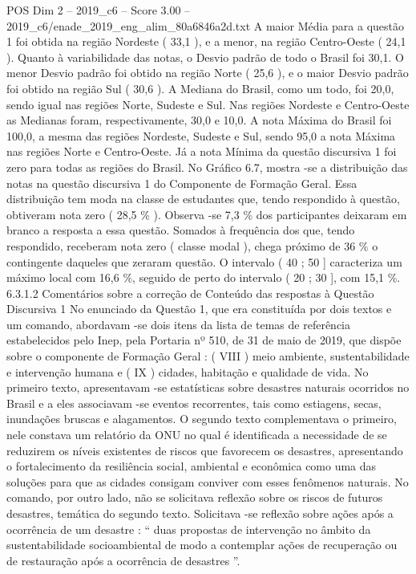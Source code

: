 \begin{textsample}{POS Dim 2 – 2019\_c6 – Score 3.00 – 2019\_c6/enade\_2019\_eng\_alim\_80a6846a2d.txt}
A maior Média para a questão 1 foi obtida na região Nordeste ( 33,1 ), e a menor, na região Centro-Oeste ( 24,1 ).
Quanto à variabilidade das notas, o Desvio padrão de todo o Brasil foi 30,1.
O menor Desvio padrão foi obtido na região Norte ( 25,6 ), e o maior Desvio padrão foi obtido na região Sul ( 30,6 ).
A Mediana do Brasil, como um todo, foi 20,0, sendo igual nas regiões Norte, Sudeste e Sul.
Nas regiões Nordeste e Centro-Oeste as Medianas foram, respectivamente, 30,0 e 10,0.
A nota Máxima do Brasil foi 100,0, a mesma das regiões Nordeste, Sudeste e Sul, sendo 95,0 a nota Máxima nas regiões Norte e Centro-Oeste.
Já a nota Mínima da questão discursiva 1 foi zero para todas as regiões do Brasil.
No Gráfico 6.7, mostra -se a distribuição das notas na questão discursiva 1 do Componente de Formação Geral.
Essa distribuição tem moda na classe de estudantes que, tendo respondido à questão, obtiveram nota zero ( 28,5 \% ).
Observa -se 7,3 \% dos participantes deixaram em branco a resposta a essa questão.
Somados à frequência dos que, tendo respondido, receberam nota zero ( classe modal ), chega próximo de 36 \% o contingente daqueles que zeraram questão.
O intervalo ( 40 ; 50 ] caracteriza um máximo local com 16,6 \%, seguido de perto do intervalo ( 20 ; 30 ], com 15,1 \%. 6.3.1.2 Comentários sobre a correção de Conteúdo das respostas à Questão Discursiva 1 No enunciado da Questão 1, que era constituída por dois textos e um comando, abordavam -se dois itens da lista de temas de referência estabelecidos pelo Inep, pela Portaria nº 510, de 31 de maio de 2019, que dispõe sobre o componente de Formação Geral : ( VIII ) meio ambiente, sustentabilidade e intervenção humana e ( IX ) cidades, habitação e qualidade de vida.
No primeiro texto, apresentavam -se estatísticas sobre desastres naturais ocorridos no Brasil e a eles associavam -se eventos recorrentes, tais como estiagens, secas, inundações bruscas e alagamentos.
O segundo texto complementava o primeiro, nele constava um relatório da ONU no qual é identificada a necessidade de se reduzirem os níveis existentes de riscos que favorecem os desastres, apresentando o fortalecimento da resiliência social, ambiental e econômica como uma das soluções para que as cidades consigam conviver com esses fenômenos naturais.
No comando, por outro lado, não se solicitava reflexão sobre os riscos de futuros desastres, temática do segundo texto.
Solicitava -se reflexão sobre ações após a ocorrência de um desastre : “ duas propostas de intervenção no âmbito da sustentabilidade socioambiental de modo a contemplar ações de recuperação ou de restauração após a ocorrência de desastres ”.

\end{textsample}

